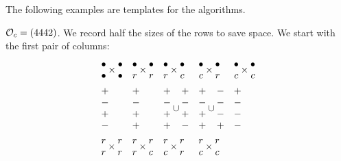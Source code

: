 \documentclass[11pt ,reqno]{amsart}
\begin{document}
\bigskip
The following examples are templates for the algorithms.
\begin{example} $\CO_c=(4442)$. We record half the sizes of the rows
  to save space. We start with the first pair of columns:
  $$
  \begin{aligned}
    &\mat\bullet\\\bullet\emat\times\mat\bullet\\\bullet\emat
    &&\mat\bullet\\ r\emat\times\mat\bullet\\ r\emat
    &&\mat\bullet\\ r\emat\times\mat\bullet\\ c\emat
    &&\mat\bullet\\ c\emat\times\mat\bullet\\ r\emat
    &&\mat\bullet\\ c\emat\times\mat\bullet\\ c\emat\\
    &\mat+\\-\\+\\-\emat
    &&\mat+\\-\\+\\+\emat
    &&\mat+\\-\\+\\+\emat\cup\mat +\\-\\+\\-\emat
    &&\mat+\\-\\+\\+\emat\cup\mat -\\-\\-\\+\emat
    &&\mat+\\-\\-\\-\emat\\
     &\mat r\\ r\emat\times\mat r\\ r\emat
    &&\mat r \\ r\emat\times\mat r\\ c\emat
    &&\mat r\\ c\emat\times\mat r\\ r\emat
    &&\mat r\\ c\emat\times\mat r\\ c\emat \\

\end{aligned}$$
\end{example}
\end{document}
